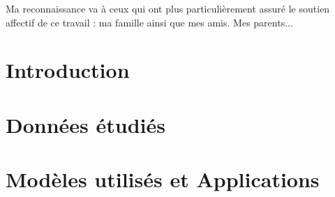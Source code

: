 \documentclass[a4paper, oneside, 12pt, final]{extreport}
\newcommand{\studyDepartment} {%
  Entreprise d'accueil 
  
}
\begin{document}


Ma reconnaissance va à ceux qui ont plus particulièrement assuré le soutien affectif de ce travail : ma famille ainsi que mes amis. Mes parents... 




\tableofcontents

\listoffigures
\listoftables
\listofalgorithms
{}
\cleardoublepage

\newpage
{}
\chapter*{Introduction}
\label{chap:general_intorduction}



\chapter{Données étudiés}%
\label{chap:chapterone}


\chapter{Modèles utilisés et Applications}
\label{chap:2}

\end{document}
